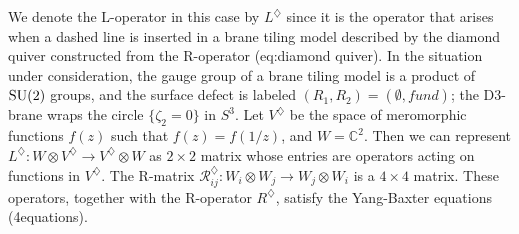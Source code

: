 We denote the L-operator in this case by $L^{\diamondsuit}$ since
it is the operator that arises when a dashed line is inserted in a
brane tiling model described by the diamond quiver constructed from
the R-operator (eq:diamond quiver). In the situation under consideration,
the gauge group of a brane tiling model is a product of $\mathrm{SU}(2)$ groups,
and the surface defect is labeled $\left( R_{1},R_{2} \right)=\left( \emptyset,fund \right)$;
the D3-brane wraps the circle $\{\zeta_{2}=0\}$ in $S^{3}$. Let
$V^{\diamondsuit}$ be the space of meromorphic functions $f(z)$
such that $f(z)=f(1/z)$, and $W=\mathbb{C}^{2}$. Then we can represent
$L^{\diamondsuit}:W\otimes V^{\diamondsuit}\rightarrow V^{\diamondsuit}\otimes W$
as $2\times2$ matrix whose entries are operators acting on functions
in $V^{\diamondsuit}$. The R-matrix $\mathcal{R}_{ij}^{\diamondsuit}:W_{i}\otimes W_{j}\rightarrow W_{j}\otimes W_{i}$
is a $4\times4$ matrix. These operators, together with the R-operator
$R^{\diamondsuit}$, satisfy the Yang-Baxter equations (4equations).

